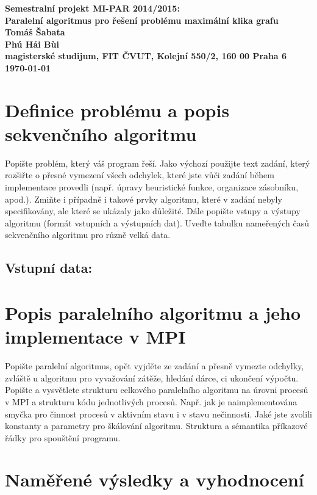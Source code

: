 \documentclass[11pt]{article}
\begin{document}
\begin{center}
	\bf Semestralní projekt MI-PAR 2014/2015:\\[5mm]
	 Paralelní algoritmus pro řešení problému maximální klika grafu\\[5mm]
       	Tomáš Šabata\\
	 Ph{\'u} H{\h a}i B{\` u}i\\[2mm]
	magisterské studijum, FIT ČVUT, Kolejní 550/2, 160 00 Praha 6\\[2mm]
	\today
\end{center}

\section{Definice problému a popis sekvenčního algoritmu}

Popište problém, který váš program řeší. Jako výchozí použijte text
zadání, který rozšiřte o přesné vymezení všech odchylek, které jste
vůči zadání během implementace provedli (např.  úpravy heuristické
funkce, organizace zásobníku, apod.). Zmiňte i případně i takové
prvky algoritmu, které v zadání nebyly specifikovány, ale které se
ukázaly jako důležité.  Dále popište vstupy a výstupy algoritmu
(formát vstupních a výstupních dat). Uveďte tabulku nameřených časů
sekvenčního algoritmu pro různě velká data.
\subsection{Vstupní data: }

\section{Popis paralelního algoritmu a jeho implementace v MPI}

Popište paralelní algoritmus, opět vyjděte ze zadání a přesně
vymezte odchylky, zvláště u algoritmu pro vyvažování zátěže, hledání
dárce, ci ukončení výpočtu.  Popište a vysvětlete strukturu
celkového paralelního algoritmu na úrovni procesů v MPI a strukturu
kódu jednotlivých procesů. Např. jak je naimplementována smyčka pro
činnost procesů v aktivním stavu i v stavu nečinnosti. Jaké jste
zvolili konstanty a parametry pro škálování algoritmu. Struktura a
sémantika příkazové řádky pro spouštění programu.



\section{Naměřené výsledky a vyhodnocení}
\end{document}
